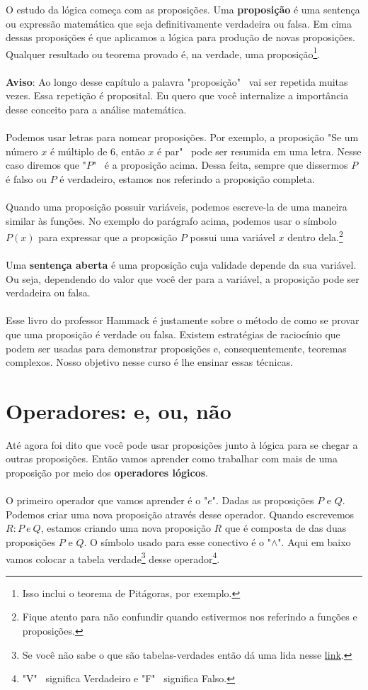 \documentclass[a4paper,11pt,oneside]{book}
\theoremstyle{definition}
\theoremstyle{break}
\begin{document}
O estudo da lógica começa com as proposições. Uma \textbf{proposição} é uma sentença ou expressão matemática que seja definitivamente verdadeira ou falsa. Em cima dessas proposições é que aplicamos a lógica para produção de novas proposições. Qualquer resultado ou teorema provado é, na verdade, uma proposição\footnote{Isso inclui o teorema de Pitágoras, por exemplo.}. 
\\
\\
\textbf{Aviso}: Ao longo desse capítulo a palavra "proposição" \ vai ser repetida muitas vezes. Essa repetição é proposital. Eu quero que você internalize a importância desse conceito para a análise matemática.
\\
\\
Podemos usar letras para nomear proposições. Por exemplo, a proposição "Se um número $x$ é múltiplo de 6, então $x$ é par" \  pode ser resumida em uma letra. Nesse caso diremos que "$P$" \ é a proposição acima. Dessa feita, sempre que dissermos $P$ é falso ou $P$ é verdadeiro, estamos nos referindo a proposição completa.
\\
\\
Quando uma proposição possuir variáveis, podemos escreve-la de uma maneira similar às funções. No exemplo do parágrafo acima, podemos usar o símbolo $P(x)$ para expressar que a proposição $P$ possui uma variável $x$ dentro dela.\footnote{Fique atento para não confundir quando estivermos nos referindo a funções e proposições.}
\\
\\
Uma \textbf{sentença aberta} é uma proposição cuja validade depende da sua variável. Ou seja, dependendo do valor que você der para a variável, a proposição pode ser verdadeira ou falsa.
\\
\\
Esse livro do professor Hammack é justamente sobre o método de como se provar que uma proposição é verdade ou falsa. Existem estratégias de raciocínio que podem ser usadas para demonstrar proposições e, consequentemente, teoremas complexos. Nosso objetivo nesse curso é lhe ensinar essas técnicas.

\section{Operadores: e, ou, não}

Até agora foi dito que você pode usar proposições junto à lógica para se chegar a outras proposições. Então vamos aprender como trabalhar com mais de uma proposição por meio dos \textbf{operadores lógicos}.
\\
\\
O primeiro operador que vamos aprender é o "$e$". Dadas as proposições $P$ e $Q$. Podemos criar uma nova proposição através desse operador. Quando escrevemos $R: P \ e \ Q$, estamos criando uma nova proposição $R$ que é composta de das duas proposições $P$ e $Q$. O símbolo usado para esse conectivo é o "$\land$". Aqui em baixo vamos colocar a tabela verdade\footnote{Se você não sabe o que são tabelas-verdades então dá uma lida nesse \href{https://www.youtube.com/watch?v=hWEZsyF3ZZc}{link}.} desse operador\footnote{"V" \ significa Verdadeiro e "F" \  significa Falso.}.
\end{document}
